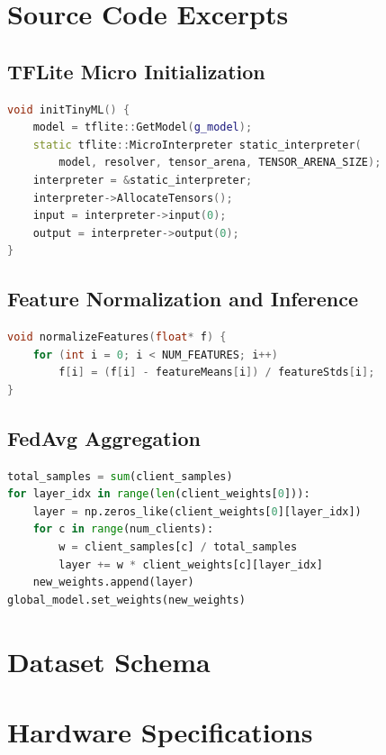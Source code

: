 \chapter{Source Code Excerpts}

\section{TFLite Micro Initialization}
\begin{lstlisting}[language=C++, caption={Model loading on MKR WAN 1310.}]
void initTinyML() {
    model = tflite::GetModel(g_model);
    static tflite::MicroInterpreter static_interpreter(
        model, resolver, tensor_arena, TENSOR_ARENA_SIZE);
    interpreter = &static_interpreter;
    interpreter->AllocateTensors();
    input = interpreter->input(0);
    output = interpreter->output(0);
}
\end{lstlisting}

\section{Feature Normalization and Inference}
\begin{lstlisting}[language=C++, caption={On-device normalization and path loss prediction.}]
void normalizeFeatures(float* f) {
    for (int i = 0; i < NUM_FEATURES; i++)
        f[i] = (f[i] - featureMeans[i]) / featureStds[i];
}
\end{lstlisting}

\section{FedAvg Aggregation}
\begin{lstlisting}[language=Python, caption={Server-side federated averaging.}]
total_samples = sum(client_samples)
for layer_idx in range(len(client_weights[0])):
    layer = np.zeros_like(client_weights[0][layer_idx])
    for c in range(num_clients):
        w = client_samples[c] / total_samples
        layer += w * client_weights[c][layer_idx]
    new_weights.append(layer)
global_model.set_weights(new_weights)
\end{lstlisting}

\chapter{Dataset Schema}

\chapter{Hardware Specifications}


